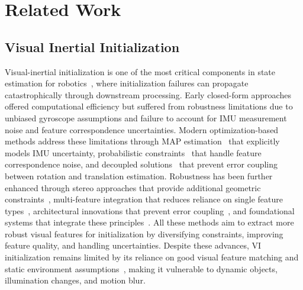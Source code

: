 \section{Related Work}
\label{sec:maci2:related}

\subsection{Visual Inertial Initialization}

Visual-inertial initialization is one of the most critical components in state estimation for robotics~\cite{qin2018vins,campos2021orb}, where initialization failures can propagate catastrophically through downstream processing.
Early closed-form approaches~\cite{martinelli2013closed,kaiser2017simultaneous,zuniga2020analytical} offered computational efficiency but suffered from robustness limitations due to unbiased gyroscope assumptions and failure to account for IMU measurement noise and feature correspondence uncertainties.
Modern optimization-based methods address these limitations through MAP estimation~\cite{campos2021orb} that explicitly models IMU uncertainty, probabilistic constraints~\cite{mu2025robust} that handle feature correspondence noise, and decoupled solutions~\cite{he2023rotation} that prevent error coupling between rotation and translation estimation.
Robustness has been further enhanced through stereo approaches that provide additional geometric constraints~\cite{wang2024stereo,eta2024init}, multi-feature integration that reduces reliance on single feature types~\cite{ple2024slam}, architectural innovations that prevent error coupling~\cite{edi2023eskf,parallel2022robust}, and foundational systems that integrate these principles~\cite{qin2018vins,geneva2020openvins,mur2017visual}.
All these methods aim to extract more robust visual features for initialization by diversifying constraints, improving feature quality, and handling uncertainties.
Despite these advances, VI initialization remains limited by its reliance on good visual feature matching and static environment assumptions~\cite{fast2019robust}, making it vulnerable to dynamic objects, illumination changes, and motion blur.

